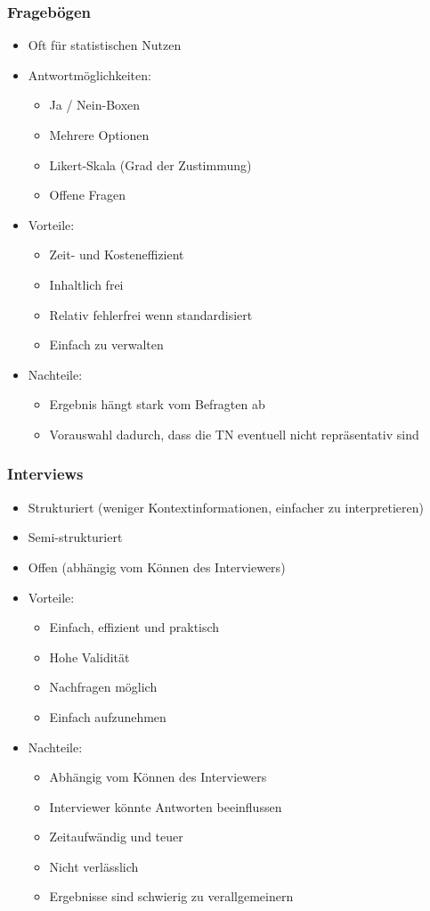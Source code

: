 \documentclass[a4paper,10pt]{article}
\begin{document}
\subsubsection{Fragebögen}
\begin{itemize}
	\item Oft für statistischen Nutzen
	\item Antwortmöglichkeiten:
	\begin{itemize}
		\item Ja / Nein-Boxen
		\item Mehrere Optionen
		\item Likert-Skala (Grad der Zustimmung)
		\item Offene Fragen
	\end{itemize}
	\item Vorteile:
	\begin{itemize}
		\item Zeit- und Kosteneffizient
		\item Inhaltlich frei
		\item Relativ fehlerfrei wenn standardisiert
		\item Einfach zu verwalten
	\end{itemize}
	\item Nachteile:
	\begin{itemize}
		\item Ergebnis hängt stark vom Befragten ab
		\item Vorauswahl dadurch, dass die TN eventuell nicht repräsentativ sind
	\end{itemize}
\end{itemize}

\subsubsection{Interviews}
\begin{itemize}
	\item Strukturiert (weniger Kontextinformationen, einfacher zu interpretieren)
	\item Semi-strukturiert
	\item Offen (abhängig vom Können des Interviewers)
	\item Vorteile:
	\begin{itemize}
		\item Einfach, effizient und praktisch
		\item Hohe Validität
		\item Nachfragen möglich
		\item Einfach aufzunehmen
	\end{itemize}
	\item Nachteile:
	\begin{itemize}
		\item Abhängig vom Können des Interviewers
		\item Interviewer könnte Antworten beeinflussen
		\item Zeitaufwändig und teuer
		\item Nicht verlässlich
		\item Ergebnisse sind schwierig zu verallgemeinern
	\end{itemize}
\end{itemize}
\end{document}

